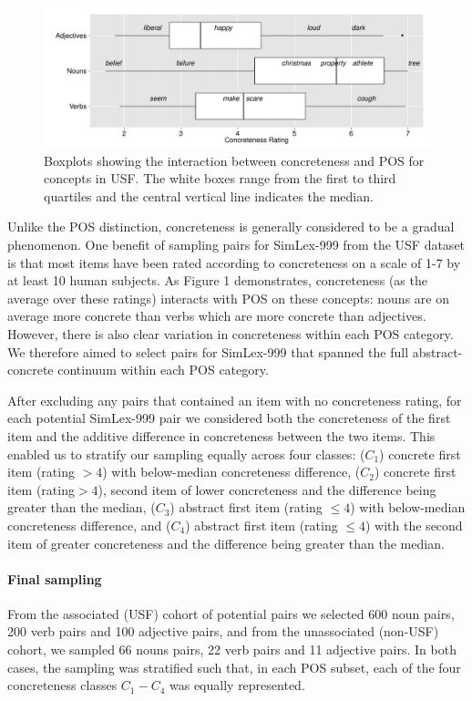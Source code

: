 \begin{figure}[ht]  \includegraphics[width = \textwidth]{Chapter_3/Figure_1_CL}  \caption{Boxplots showing the interaction between concreteness and POS for concepts in USF. The white boxes range from the first to third quartiles and the central vertical line indicates the median.}\end{figure}  

Unlike the POS distinction, concreteness  is generally considered to be a gradual phenomenon. One benefit of sampling pairs for SimLex-999 from the USF dataset is that most items have been rated according to concreteness on a scale of 1-7 by at least 10 human subjects. As Figure 1 demonstrates, concreteness (as the average over these ratings) interacts with POS on these concepts: nouns are on average more concrete than verbs which are more concrete than adjectives. However, there is also clear variation in concreteness within each POS category. We therefore aimed to select pairs for SimLex-999 that spanned the full abstract-concrete continuum within each POS category. 

After excluding any pairs that contained an item with no concreteness rating, for each potential SimLex-999 pair we considered both the concreteness of the first item and the additive difference in concreteness between the two items. This enabled us to stratify our sampling equally across four classes: (\( C_1\)) concrete first item (rating \(> 4\)) with below-median concreteness difference, (\( C_2\)) concrete first item (rating\( > 4\)), second item of lower concreteness and the difference being greater than the median, (\( C_3\)) abstract first item (rating \( \leq 4\)) with below-median concreteness difference, and (\( C_4\)) abstract first item (rating \(\leq 4\)) with the second item of greater concreteness and the difference being greater than the median. 

\paragraph{Final sampling} From the associated (USF) cohort of potential pairs we selected 600 noun pairs, 200 verb pairs and 100 adjective pairs, and from the unassociated (non-USF) cohort, we sampled 66 nouns pairs, 22 verb pairs and 11 adjective pairs. In both cases, the sampling was stratified such that, in each POS subset, each of the four concreteness classes \(C_1 - C_4\) was equally represented. 

